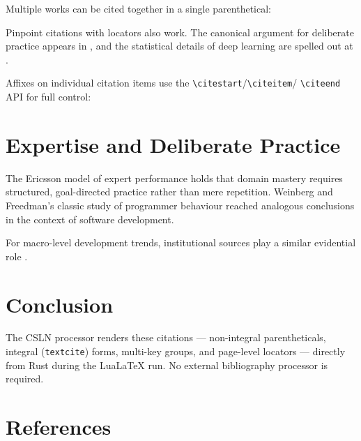 \documentclass[12pt, a4paper]{article}
\begin{document}
Multiple works can be cited together in a single parenthetical:
\cites{kuhn1962, lecun2015, vaswani2017}

Pinpoint citations with locators also work.
The canonical argument for deliberate practice appears in
\textcite[p.~690]{ericsson2006}, and the statistical details of deep
learning are spelled out at \cite[pp.~438--440]{lecun2015}.

Affixes on individual citation items use the \texttt{\textbackslash citestart}/\texttt{\textbackslash citeitem}/%
\texttt{\textbackslash citeend} API for full control:
%
\citestart
\citeend

\section{Expertise and Deliberate Practice}

The Ericsson model of expert performance \cite{ericsson2006} holds that
domain mastery requires structured, goal-directed practice rather than
mere repetition.
Weinberg and Freedman's classic study of programmer behaviour
\cite{weinberg1971} reached analogous conclusions in the context of
software development.

For macro-level development trends, institutional sources play a similar
evidential role \cite{worldbank2023}.

\section{Conclusion}

The CSLN processor renders these citations --- non-integral parentheticals,
integral (\texttt{textcite}) forms, multi-key groups, and page-level
locators --- directly from Rust during the Lua\LaTeX{} run.
No external bibliography processor is required.

\newpage
\section*{References}
\printcslnbibliography
\end{document}
